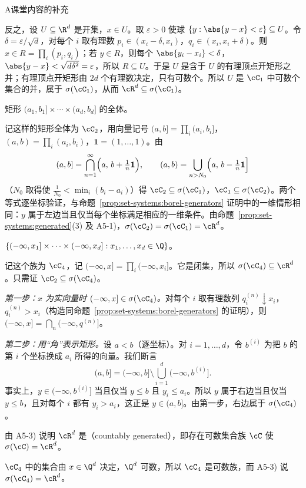 \begin{exercises}{A}{课堂内容的补充}
\begin{questions}
\begin{solution}
反之，设 $U\subseteq\R^d$ 是开集，$x\in U$。取 $\varepsilon>0$ 使球 $\{y:\abs{y-x}<\varepsilon\}\subseteq U$。令 $\delta=\varepsilon/\sqrt d$，对每个 $i$ 取有理数 $p_i\in(x_i-\delta,x_i)$，$q_i\in(x_i,x_i+\delta)$。则 $x\in R=\prod_i(p_i,q_i)$；若 $y\in R$，则每个 $\abs{y_i-x_i}<\delta$，$\abs{y-x}<\sqrt{d\delta^2}=\varepsilon$，所以 $R\subseteq U$。于是 $U$ 是含于 $U$ 的有理顶点开矩形之并；有理顶点开矩形由 $2d$ 个有理数决定，只有可数个。所以 $U$ 是 $\cC_1$ 中可数个集合的并，属于 $\sigma(\cC_1)$，从而 $\cR^d\subseteq\sigma(\cC_1)$。
\end{solution}
\item 矩形 $(a_1,b_1]\times\cdots\times(a_d,b_d]$ 的全体。
\begin{solution}
记这样的矩形全体为 $\cC_2$，用向量记号 $(a,b]=\prod_i(a_i,b_i]$，$(a,b)=\prod_i(a_i,b_i)$，$\mathbf 1=(1,\dots,1)$。由
\[
(a,b]=\bigcap_{n=1}^\infty\Bigl(a,\,b+\tfrac1n\mathbf 1\Bigr),\qquad
(a,b)=\bigcup_{n>N_0}\Bigl(a,\,b-\tfrac1n\mathbf 1\Bigr]
\]
（$N_0$ 取得使 $\frac1{N_0}<\min_i(b_i-a_i)$）得 $\cC_2\subseteq\sigma(\cC_1)$，$\cC_1\subseteq\sigma(\cC_2)$。两个等式逐坐标验证，与命题~\ref{prop:set-systems:borel-generators} 证明中的一维情形相同：$y$ 属于左边当且仅当每个坐标满足相应的一维条件。由命题~\ref{prop:set-systems:generated}(3) 及 A5-1)，$\sigma(\cC_2)=\sigma(\cC_1)=\cR^d$。
\end{solution}
\item $\{(-\infty,x_1]\times\cdots\times(-\infty,x_d]: x_1,\dots,x_d\in\Q\}$。
\begin{solution}
记这个族为 $\cC_4$，记 $(-\infty,x]=\prod_i(-\infty,x_i]$。它是闭集，所以 $\sigma(\cC_4)\subseteq\cR^d$。只需证 $\cC_2\subseteq\sigma(\cC_4)$。

\emph{第一步：$x$ 为实向量时 $(-\infty,x]\in\sigma(\cC_4)$。}对每个 $i$ 取有理数列 $q^{(n)}_i\downarrow x_i$，$q^{(n)}_i>x_i$（构造同命题~\ref{prop:set-systems:borel-generators} 的证明），则 $(-\infty,x]=\bigcap_n(-\infty,q^{(n)}]$。

\emph{第二步：用“角”表示矩形。}设 $a<b$（逐坐标）。对 $i=1,\dots,d$，令 $b^{(i)}$ 为把 $b$ 的第 $i$ 个坐标换成 $a_i$ 所得的向量。我们断言
\[
(a,b]=(-\infty,b]\setminus\bigcup_{i=1}^d(-\infty,b^{(i)}].
\]
事实上，$y\in(-\infty,b^{(i)}]$ 当且仅当 $y\leqslant b$ 且 $y_i\leqslant a_i$。所以 $y$ 属于右边当且仅当 $y\leqslant b$，且对每个 $i$ 都有 $y_i>a_i$，这正是 $y\in(a,b]$。由第一步，右边属于 $\sigma(\cC_4)$。
\end{solution}
\item 由 A5-3) 说明 $\cR^d$ 是（countably generated），即存在可数集合族 $\cC$ 使 $\sigma(\cC)=\cR^d$。
\begin{solution}
$\cC_4$ 中的集合由 $x\in\Q^d$ 决定，$\Q^d$ 可数，所以 $\cC_4$ 是可数族，而 A5-3) 说 $\sigma(\cC_4)=\cR^d$。
\end{solution}
\end{questions}


\end{exercises}
